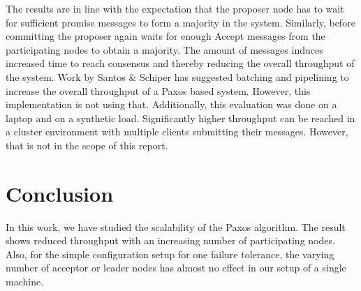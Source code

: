 \documentclass[conference]{IEEEtran}
\begin{document}
The results are in line with the expectation that the proposer node has to wait for sufficient promise messages to form a majority in the system. 
Similarly, before committing the proposer again waits for enough Accept messages from the participating nodes to obtain a majority. 
The amount of messages induces increased time to reach consensus and thereby reducing the overall throughput of the system. 
Work by Santos \& Schiper \cite{b2} has suggested batching and pipelining to increase the overall throughput of a Paxos based system. 
However, this implementation is not using that. 
Additionally, this evaluation was done on a laptop and on a synthetic load. 
Significantly higher throughput can be reached in a cluster environment with multiple clients submitting their messages. 
However, that is not in the scope of this report. 
\section{Conclusion}
In this work, we have studied the scalability of the Paxos algorithm. 
The result shows reduced throughput with an increasing number of participating nodes. 
Also, for the simple configuration setup for one failure tolerance, the varying number of acceptor or leader nodes has almost no effect in our setup of a single machine. 

%
%
\end{document}
